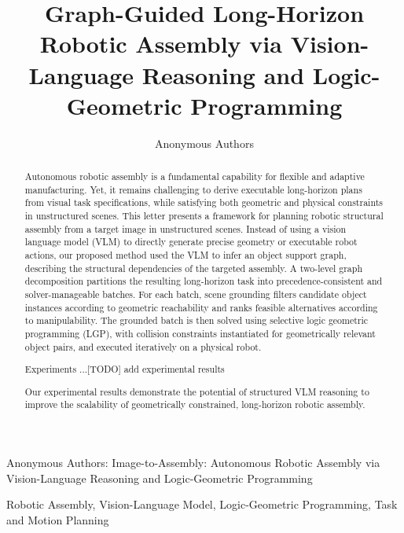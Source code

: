 \documentclass[journal]{IEEEtran}
\begin{document}
\title{Graph-Guided Long-Horizon Robotic Assembly via Vision-Language Reasoning and Logic-Geometric Programming}

\author{Anonymous Authors}

%
{Anonymous Authors: Image-to-Assembly: Autonomous Robotic Assembly via Vision-Language Reasoning and Logic-Geometric Programming}

\maketitle

\begin{abstract}
Autonomous robotic assembly is a fundamental capability for flexible and adaptive manufacturing.
Yet, it remains challenging to derive executable long-horizon plans from visual task specifications, while satisfying both geometric and physical constraints in unstructured scenes.
This letter presents a framework for planning robotic structural assembly from a target image in unstructured scenes.
Instead of using a vision language model (VLM) to directly generate precise geometry or executable robot actions, our proposed method used the VLM to infer an object support graph, describing the structural dependencies of the targeted assembly. A two-level graph decomposition partitions the resulting long-horizon task into precedence-consistent and solver-manageable batches.
For each batch, scene grounding filters candidate object instances according to geometric reachability and ranks feasible alternatives according to manipulability.
The grounded batch is then solved using selective logic geometric programming (LGP), with collision constraints instantiated for geometrically relevant object pairs, and executed iteratively on a physical robot.

Experiments ...[TODO] add experimental results

Our experimental results demonstrate the potential of structured VLM reasoning to improve the scalability of geometrically constrained, long-horizon robotic assembly.
\end{abstract}

\begin{IEEEkeywords}
Robotic Assembly, Vision-Language Model, Logic-Geometric Programming, Task and Motion Planning
\end{IEEEkeywords}
\end{document}
